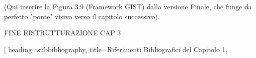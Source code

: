 \begin{refsection}
(Qui inserire la Figura 3.9 (Framework GIST) dalla versione Finale, che funge da perfetto "ponte" visivo verso il capitolo successivo).

FINE RISTRUTTURAZIONE CAP 3

\printbibliography[
    heading=subbibliography, %
    title={Riferimenti Bibliografici del Capitolo 1}, %
\end{refsection} %




